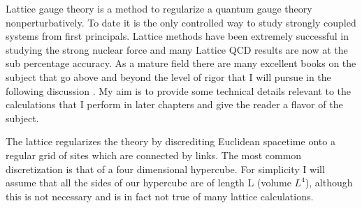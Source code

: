 
Lattice gauge theory is a method to regularize a quantum gauge theory nonperturbatively.
To date it is the only controlled way to study strongly coupled systems from first principals.
Lattice methods have been extremely successful in studying the strong nuclear force and many Lattice QCD results are now at the sub percentage accuracy.
As a mature field there are many excellent books on the subject that go above and beyond the level of rigor that I will pursue in the following discussion \cite{degrand:book,smit:book,gattringer:book}.
My aim is to provide some technical details relevant to the calculations that I perform in later chapters and give the reader a flavor of the subject.

The lattice regularizes the theory by discrediting Euclidean spacetime onto a regular grid of sites which are connected by links.
The most common discretization is that of a four dimensional hypercube.
For simplicity I will assume that all the sides of our hypercube are of length L (volume $L^4$), although this is not necessary and is in fact not true of many lattice calculations.
